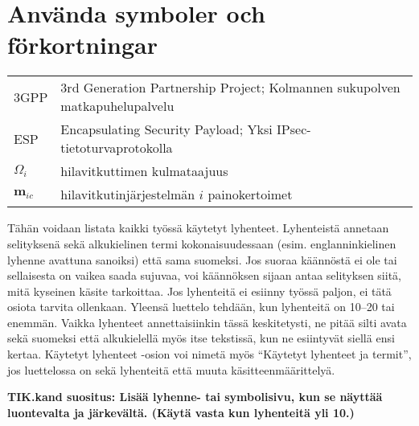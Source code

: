 %
%


\section*{Använda symboler och förkortningar}

\begin{center}
\begin{tabular}{p{}p{}}
3GPP  & 3rd Generation Partnership Project; Kolmannen sukupolven 
matkapuhelupalvelu \\ 
ESP & Encapsulating Security Payload; Yksi IPsec-tietoturvaprotokolla \\ 
$\Omega_i$ & hilavitkuttimen kulmataajuus \\
$\mathbf{m}_{ic}$ & hilavitkutinjärjestelmän $i$ painokertoimet \\
\end{tabular}
\end{center}

\vspace{10mm}

Tähän voidaan listata kaikki työssä käytetyt lyhenteet. Lyhenteistä
annetaan selityksenä sekä alkukielinen termi kokonaisuudessaan
(esim. englanninkielinen lyhenne avattuna sanoiksi) että sama
suomeksi. Jos suoraa käännöstä ei ole tai sellaisesta on vaikea saada
sujuvaa, voi käännöksen sijaan antaa selityksen siitä, mitä kyseinen
käsite tarkoittaa. Jos lyhenteitä ei esiinny työssä paljon, ei tätä
osiota tarvita ollenkaan. Yleensä luettelo tehdään, kun lyhenteitä on
10--20 tai enemmän. Vaikka lyhenteet annettaisiinkin tässä
keskitetysti, ne pitää silti avata sekä suomeksi että alkukielellä
myös itse tekstissä, kun ne esiintyvät siellä ensi kertaa.  Käytetyt
lyhenteet -osion voi nimetä myös ``Käytetyt lyhenteet ja termit'', jos
luettelossa on sekä lyhenteitä että muuta käsitteenmäärittelyä.

\textbf{TIK.kand suositus: Lisää lyhenne- tai symbolisivu, kun se
  näyttää luontevalta ja järkevältä. (Käytä vasta kun lyhenteitä yli 10.)}



